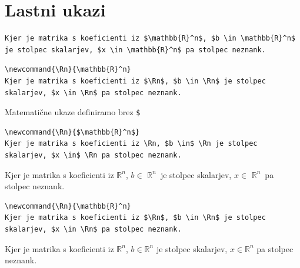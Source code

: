 \documentclass[aspectratio=169]{beamer}
\begin{document}
\section{Lastni ukazi}

\begin{frame}[fragile]{}
  \begin{slaboenv}
    \begin{verbatim}
Kjer je matrika s koeficienti iz $\mathbb{R}^n$, $b \in \mathbb{R}^n$
je stolpec skalarjev, $x \in \mathbb{R}^n$ pa stolpec neznank.
    \end{verbatim}
  \end{slaboenv}

  \begin{dobroenv}
    \begin{verbatim}
\newcommand{\Rn}{\mathbb{R}^n}
Kjer je matrika s koeficienti iz $\Rn$, $b \in \Rn$ je stolpec
skalarjev, $x \in \Rn$ pa stolpec neznank.
    \end{verbatim}
  \end{dobroenv}
\end{frame}

\begin{frame}[fragile]{Matematične ukaze definiramo brez \texttt{\$}}
  \begin{slaboenv}
    \begin{verbatim}
\newcommand{\Rn}{$\mathbb{R}^n$}
Kjer je matrika s koeficienti iz \Rn, $b \in$ \Rn je stolpec
skalarjev, $x \in$ \Rn pa stolpec neznank.
    \end{verbatim}
    \newcommand{\Rn}{$\mathbb{R}^n$}
    Kjer je matrika s koeficienti iz \Rn, $b \in$ \Rn\ je stolpec skalarjev,
    $x \in$ \Rn\ pa stolpec neznank.
  \end{slaboenv}

  \begin{dobroenv}
    \begin{verbatim}
\newcommand{\Rn}{\mathbb{R}^n}
Kjer je matrika s koeficienti iz $\Rn$, $b \in \Rn$ je stolpec
skalarjev, $x \in \Rn$ pa stolpec neznank.
    \end{verbatim}
    \newcommand{\Rn}{\mathbb{R}^n}
    Kjer je matrika s koeficienti iz $\Rn$, $b \in \Rn$ je stolpec skalarjev,
    $x \in \Rn$ pa stolpec neznank.
  \end{dobroenv}
\end{frame}
\end{document}
